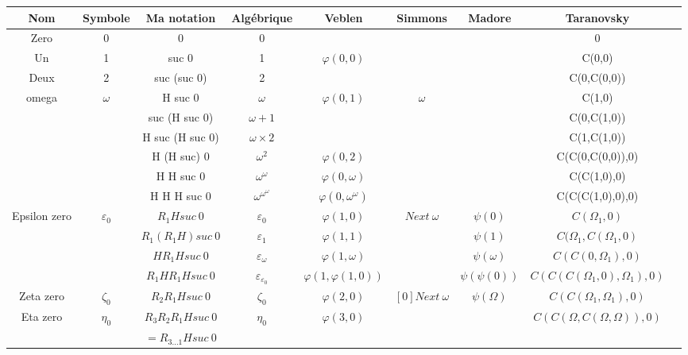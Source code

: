 \documentclass[8pt]{article}
\begin{document}
\begin{tabular}{|c|c|c|c|c|c|c|c|c|}
\hline
Nom		& Symbole		& Ma notation		& Algébrique			& Veblen			& Simmons			& Madore				& Taranovsky 			\\
\hline
Zero		& 0			& 0			& 0				& 				& 				& 					& 0				\\ \hline
Un		& 1			& suc 0			& 1				& \(\varphi(0,0)\)		& 				& 					& C(0,0)			\\ \hline
Deux		& 2			& suc (suc 0)		& 2				& 				& 				& 					& C(0,C(0,0))			\\ \hline
omega		& \(\omega\)		& H suc 0		& \(\omega\)			& \(\varphi(0,1)\)		& \(\omega\)			& 					& C(1,0)			\\ \hline
		& 			& suc (H suc 0)		& \(\omega+1\)			& 				& 				& 					& C(0,C(1,0))			\\ \hline
		&			& H suc (H suc 0)	& \(\omega\times2\)		&				& 				& 					& C(1,C(1,0))			\\ \hline
		&			& H (H suc) 0		& \(\omega^2\)			& \(\varphi(0,2)\)		& 				& 					& C(C(0,C(0,0)),0)		\\ \hline
		&			& H H suc 0		& \(\omega^\omega\)		& \(\varphi(0,\omega)\)		& 				& 					& C(C(1,0),0)			\\ \hline
		&			& H H H suc 0		& \(\omega^{\omega^\omega}\)	& \(\varphi(0,\omega^\omega)\)	&				&					& C(C(C(1,0),0),0)		\\ \hline
Epsilon zero	& \(\varepsilon_0\)	& \(R_1 H suc\ 0\)	& \(\varepsilon_0\)		& \(\varphi(1,0)\)		& \(Next\ \omega\)		& \(\psi(0)\)				& \(C(\Omega_1,0)\)		\\ \hline
		& 			& \(R_1 (R_1 H) suc\ 0\)& \(\varepsilon_1\)		& \(\varphi(1,1)\)		& 				& \(\psi(1)\)				& \(C(\Omega_1,C(\Omega_1,0)\)	\\ \hline
		& 			& \(H R_1 H suc\ 0\)	& \(\varepsilon_\omega\)	& \(\varphi(1,\omega)\) 	&				& \(\psi(\omega)\)			& \(C(C(0,\Omega_1),0)\)	\\ \hline
		& 			& \(R_1 H R_1 H suc\ 0\)&\(\varepsilon_{\varepsilon_0}\)& \(\varphi(1,\varphi(1,0))\)	&				& \(\psi(\psi(0))\)			& \(C(C(C(\Omega_1,0),\Omega_1),0)\)\\ \hline
Zeta zero	& \(\zeta_0\)		& \(R_2 R_1 H suc\ 0\)	& \(\zeta_0\)			& \(\varphi(2,0)\)		& \([0] Next\ \omega\)		& \(\psi(\Omega)\)			& \(C(C(\Omega_1,\Omega_1),0)\)	\\ \hline
Eta zero	& \(\eta_0\)		& \(R_3 R_2 R_1 H suc\ 0\)& \(\eta_0\)			& \(\varphi(3,0)\)		&				&					& \(C(C(\Omega,C(\Omega,\Omega)),0)\) \\ \
		&			& \(= R_{3 \ldots 1} H suc\ 0\)&			&				&				&					&				\\ \hline

\end{tabular}
\end{document}
